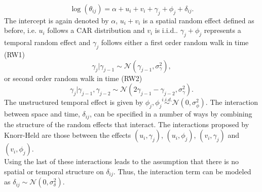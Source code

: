 \documentclass[12pt]{book}
\begin{document}
\begin{equation}
    \log\left(\theta_{ij}\right)=\alpha+u_i+v_i+\gamma_j+\phi_j+\delta_{ij}.
\end{equation}
The intercept is again denoted by $\alpha$, $u_i + v_i$ is a spatial random effect defined as before, i.e. $u_i$ follows a CAR distribution and $v_i$ is i.i.d.. $\gamma_j+\phi_j$ represents a temporal random effect and $\gamma_j$ follows either a first order random walk in time (RW1)
\begin{equation}
    \gamma_j|\gamma_{j-1}\sim\mathcal{N}\left(\gamma_{j-1},\sigma_\gamma^2\right),
\end{equation}
or second order random walk in time (RW2)
\begin{equation}
    \gamma_j|\gamma_{j-1},\gamma_{j-2}\sim\mathcal{N}\left(2\gamma_{j-1}-\gamma_{j-2},\sigma_\gamma^2\right).
\end{equation}
The unstructured temporal effect is given by $\phi_j, \phi_j\overset{i.i.d.}{\sim}\mathcal{N}\left(0, \sigma_\phi^2\right)$. The interaction between space and time, $\delta_{ij}$, can be specified in a number of ways by combining the structure of the random effects that interact. The interactions proposed by Knorr-Held are those between the effects $\left(u_i,\gamma_j\right)$, $\left(u_i,\phi_j\right)$, $\left(v_i,\gamma_j\right)$ and $\left(v_i,\phi_j\right)$. \\
Using the last of these interactions leads to the assumption that there is no spatial or temporal structure on $\delta_{ij}$. Thus, the interaction term can be modeled as $\delta_{ij}\sim\mathcal{N}\left(0,\sigma_\delta^2\right)$.
\end{document}

